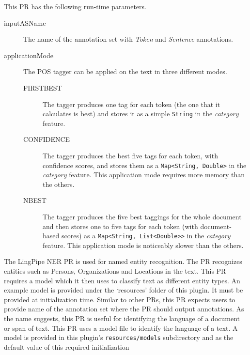 This PR has the following run-time parameters.
\begin{description}
\item[inputASName] The name of the annotation set with \emph{Token} and
  \emph{Sentence} annotations.
\item[applicationMode] The POS tagger can be applied on the text in three
  different modes.
  \begin{description}
  \item[FIRSTBEST] The tagger produces one tag for each token (the one that it
    calculates is best) and stores it as a simple \texttt{String} in the
    \emph{category} feature.
  \item[CONFIDENCE] The tagger produces the best five tags for each token, with
    confidence scores, and stores them as a \texttt{Map<String, Double>} in the
    \emph{category} feature.  This application mode requires more memory than
    the others.
  \item[NBEST] The tagger produces the five best taggings for the whole document
    and then stores one to five tags for each token (with document-based scores)
    as a \texttt{Map<String, List<Double>>} in the \emph{category} feature.
    This application mode is noticeably slower than the others.
  \end{description}
\end{description}
%
The LingPipe NER PR is used for named entity recognition. The PR recognizes
entities such as Persons, Organizations and Locations in the text. This PR 
requires a model which it then uses to classify text as different entity types.
An example model is provided under the  `resources' folder of this plugin.  It
must be provided at initialization time.  Similar to other PRs, this PR
expects users to provide name of the annotation set where the PR should output 
annotations.
%
As the name suggests, this PR is useful for identifying the language of a
document or span of text.  This PR uses a model file to identify the language of
a text. A model is provided in this plugin's \texttt{resources/models}
subdirectory and as the default value of this required initialization
